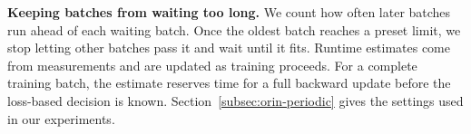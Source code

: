 \noindent\textbf{Keeping batches from waiting too long.}
We count how often later batches run ahead of each waiting batch.
Once the oldest batch reaches a preset limit, we stop letting other batches pass it and wait until it fits.
Runtime estimates come from measurements and are updated as training proceeds.
For a complete training batch, the estimate reserves time for a full backward update before the loss-based decision is known.
Section~\ref{subsec:orin-periodic} gives the settings used in our experiments.



\par
\endgroup
